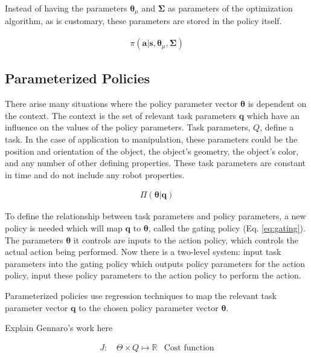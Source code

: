 \documentclass[12pt]{article}
\newcommand{\polg}   {\ensuremath{\Pi}}
\newcommand{\pol}    {\ensuremath{\pi}}
\newcommand{\act}    {\ensuremath{\mathbf{a}}}
\newcommand{\sta}    {\ensuremath{\mathbf{s}}}
\newcommand{\appsp}  {\ensuremath{\Theta}}
\newcommand{\feat}   {\ensuremath{f}}
\newcommand{\featsp} {\ensuremath{\emph{F}}}
\newcommand{\costsp} {\ensuremath{R}}
\newcommand{\taskp}  {\ensuremath{\mathbf{q}}}
\newcommand{\taskpv} {\ensuremath{q}}
\newcommand{\costf}  {\ensuremath{J}}
\newcommand{\obsm}   {\ensuremath{O}}
\newcommand{\app}    {\ensuremath{\bm{\theta}}}
\newcommand{\taskpsp}{\ensuremath{Q}}
\newcommand{\featv}  {\ensuremath{\mathbf{f}}}
\newcommand{\covar}  {\ensuremath{\bm{\Sigma}}}
\begin{document}
Instead of having the parameters $\app_\mu$ and $\covar$ as parameters of the optimization algorithm, as is customary, these parameters are stored in the policy itself. 

\begin{align}
\label{eq:opt}\pi(\act|\sta,\app_\mu,\covar)
\end{align}



\subsection{Parameterized Policies}

There arise many situations where the  policy parameter vector $\app$ is dependent on the context. The context is the set of relevant task parameters $\taskp$ which have an influence on the values of the policy parameters. Task parameters, \emph{\taskpsp}, define a task. In the case of application to manipulation, these parameters could be the position and orientation of the object, the object's geometry, the object's color, and any number of other defining properties. These task parameters are constant in time and do not include any robot properties. 

\begin{align}
\label{eq:gating}\polg(\app|\taskp)
\end{align}

To define the relationship between task parameters and policy parameters, a new policy is needed which will map $\taskp$ to $\app$, called the gating policy (Eq. \ref{eq:gating}). The parameters $\app$ it controls are inputs to the action policy, which controls the actual action being performed. Now there is a two-level system: input task parameters into the gating policy which outputs policy parameters for the action policy, input these policy parameters to the action policy to perform the action. 


Parameterized policies use regression techniques to map the relevant task parameter vector $\taskp$ to the chosen policy parameter vector $\app$.

\color{red} Explain Gennaro's work here \color{black}

\begin{align}
\costf\mbox{: } &\label{eq:cost_task} \appsp \times \taskpsp \mapsto \mathbb{R}&\mbox{Cost function}
\end{align}



\end{document}
